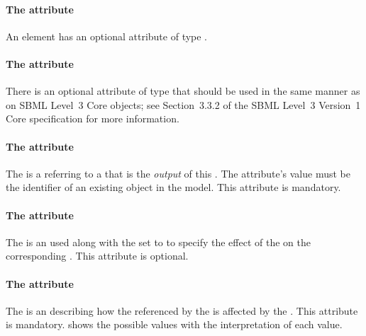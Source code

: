 \paragraph{The  attribute}
An \Output element has an optional  attribute of type . 

\paragraph{The  attribute}
There is an optional  attribute of type  that should be used
in the same manner as on SBML Level~3 Core
objects; see Section~3.3.2 of the SBML Level~3 Version~1 Core
specification for more information.



\paragraph{The  attribute}
The  is a  referring to a \QualitativeSpecies that is the \emph{output} of this \Transition. The attribute's value must be the identifier of an existing \QualitativeSpecies object in the model. This attribute is mandatory.

\paragraph{The  attribute}
The  is an  used along with the  set to  to specify the effect of the \Transition on the corresponding \QualitativeSpecies. This attribute is optional. 

\paragraph{The  attribute}
The  is an  describing how the \QualitativeSpecies referenced by the \Output is affected by the \Transition. This attribute is mandatory.  shows the possible values with the interpretation of each value.

